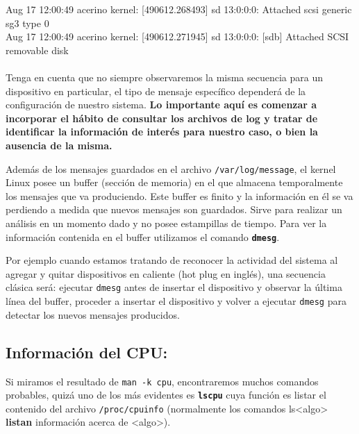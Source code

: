 \documentclass[12pt]{article}
\begin{document}
{{{{Aug 17 12:00:49 acerino kernel: [490612.268493] sd 13:0:0:0: Attached scsi generic sg3 type 0\\
Aug 17 12:00:49 acerino kernel: [490612.271945] sd 13:0:0:0: [sdb] Attached SCSI removable disk\\
}
\\
Tenga en cuenta que no siempre observaremos la misma secuencia para un dispositivo en particular, 
el tipo de mensaje específico dependerá de la configuración de nuestro sistema. \textbf{Lo 
importante aquí es comenzar a incorporar el hábito de consultar los archivos de log y tratar de 
identificar la información de interés para nuestro caso, o bien la ausencia de la misma.} 
} \vspace*{0.5cm} } } 

Además de los mensajes guardados en el archivo \texttt{/var/log/message}, el kernel Linux posee un buffer 
(sección de memoria) en el que almacena temporalmente los mensajes que va produciendo. Este buffer es 
finito y la información en él se va perdiendo a medida que nuevos mensajes son guardados. Sirve para realizar 
un análisis en un momento dado y no posee estampillas de tiempo. Para ver la información contenida en el 
buffer utilizamos el comando \texttt{\textbf{dmesg}}. 

Por ejemplo cuando estamos tratando de reconocer la actividad del sistema al agregar y quitar 
dispositivos en caliente (hot plug en inglés), una secuencia clásica será: ejecutar \texttt{dmesg} 
antes de insertar el dispositivo y observar la última línea del buffer, proceder a insertar 
el dispositivo y volver a ejecutar \texttt{dmesg} para detectar los nuevos mensajes producidos. 

\subsection*{Información del CPU:}

Si miramos el resultado de \texttt{man -k cpu}, encontraremos muchos comandos probables, quizá 
uno de los más evidentes es \textbf{\texttt{lscpu}} cuya función es listar el contenido del archivo 
\texttt{/proc/cpuinfo} (normalmente los comandos ls{\textless}algo\textgreater  
\textbf{listan} información acerca de {\textless}algo\textgreater).
\end{document}
